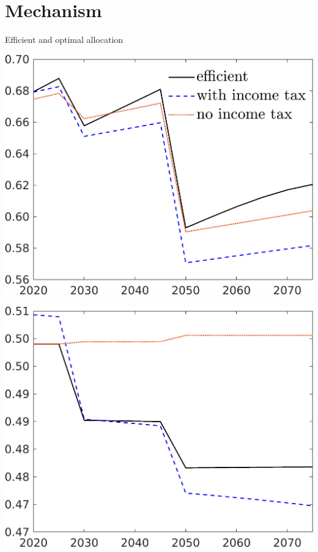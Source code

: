 \documentclass[11pt,aspectratio=169]{beamer}
\begin{document}
\section*{Mechanism}
\begin{frame}{Efficient and optimal allocation }
	\centering
	\begin{minipage}[]{0.32\textwidth}
		\includegraphics[width=1\textwidth]{../codding_model/own_basedOnFried/optimalPol_elastS_DisuSci/figures/all_1705/C_CompEffOPT_T_NoTaus_spillover0_sep1_BN0_ineq0_red0_etaa0.79_lgd1.png}
	\end{minipage}
	\begin{minipage}[]{0.32\textwidth}
		\includegraphics[width=1\textwidth]{../codding_model/own_basedOnFried/optimalPol_elastS_DisuSci/figures/all_1705/hh_CompEffOPT_T_NoTaus_spillover0_sep1_BN0_ineq0_red0_etaa0.79_lgd0.png}

\end{minipage}
\end{frame}
\end{document}
